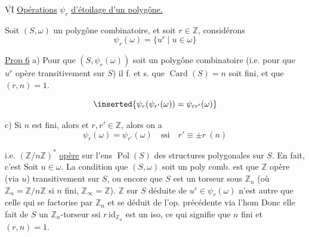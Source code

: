 $\overline{\underline{\mathrm{VI}}}$ \uline{Opérations} $\psi_r$ \uline{d'étoilage d'un polygône.}

Soit $(S,\omega)$ un polygône combinatoire, et soit $r\in\mathbb Z$, considérons
\[
\psi_r(\omega)=\{u^r\mid u\in\omega\}\tag*{(23)}
\]

\uline{Prop 6} a) Pour que  $(S,\psi_r(\omega))$ soit un polygône combinatoire (i.e. pour que $u^r$ opère transitivement sur $S$) il f. et s. que  $\operatorname{Card}(S)=n$ soit fini, et que $(r,n)=1$. 

\[
\inserted{\psi_r(\psi_{r'}(\omega))=\psi_{rr'}(\omega)}
\]

c) Si  $n$ est fini, alors   et  $r,r'\in\mathbb Z$,  alors on a
\[
\psi_r(\omega)=\psi_{r'}(\omega)\quad\text{ssi}\quad r'\equiv\pm r\ (n)
\]
    

i.e.  $(\mathbb Z/n\mathbb Z)^*$ \uline{opère} sur l'ens $\operatorname{Pol}(S)$ des structures polygonales sur $S$. En fait, c'est
 Soit $u\in\omega$. La condition que $(S,\omega)$ soit un poly comb. est que $\mathbb Z$ opère (via $u$) transitivement sur $S$,  ou encore que $S$ est un torseur sous $\mathbb Z_n$ (où $\mathbb Z_n=\mathbb Z/n\mathbb Z$ si $n$ fini, $\mathbb Z_\infty=\mathbb Z$).   $\mathbb Z$ sur $S$ déduite de $u^r\in\psi_r(\omega)$ n'est autre que celle qui se factorise par $\mathbb Z_n$ et se déduit de l'op. précédente via l'hom
Donc elle fait de $S$ un $\mathbb Z_n$-torseur ssi $r\,\mathrm{id}_{\mathbb Z_n}$ est un iso, ce qui signifie que $n$ fini et $(r,n)=1$.

